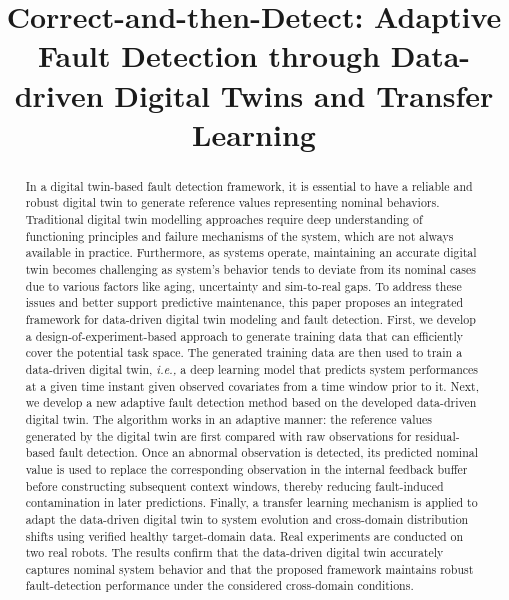 \documentclass[a4paper,10pt]{cas-sc}%
\newcommand{\roundtworev}[1]{\textcolor{roundtwored}{#1}}
\begin{document}
\let\WriteBookmarks\relax
\def\floatpagepagefraction{1}
\def\textpagefraction{.001}
\shorttitle{}
\let\printorcid\relax %



\title [mode = title]{Correct-and-then-Detect: Adaptive Fault Detection through Data-driven Digital Twins and Transfer Learning}




\begin{abstract}
	In a digital twin-based fault detection framework, it is essential to have a reliable and robust digital twin to generate reference values representing nominal behaviors. Traditional digital twin modelling approaches require deep understanding of functioning principles and failure mechanisms of the system, which are not always available in practice. Furthermore, as systems operate, maintaining an accurate digital twin becomes challenging as system's behavior tends to deviate from its nominal cases due to various factors like aging, uncertainty and sim-to-real gaps. To address these issues and better support predictive maintenance, this paper proposes an integrated framework for data-driven digital twin modeling and fault detection. First, we develop a design-of-experiment-based approach to generate training data that can efficiently cover the potential task space. The generated training data are then used to train a data-driven digital twin, \emph{i.e.,} a deep learning model that predicts system performances at a given time instant given observed covariates from a time window prior to it. Next, we develop a new adaptive fault detection method based on the developed data-driven digital twin. \roundtworev{The algorithm works in an adaptive manner: the reference values generated by the digital twin are first compared with raw observations for residual-based fault detection. Once an abnormal observation is detected, its predicted nominal value is used to replace the corresponding observation in the internal feedback buffer before constructing subsequent context windows, thereby reducing fault-induced contamination in later predictions.} \roundtworev{Finally, a transfer learning mechanism is applied to adapt the data-driven digital twin to system evolution and cross-domain distribution shifts using verified healthy target-domain data.} Real experiments are conducted on two real robots. \roundtworev{The results confirm that the data-driven digital twin accurately captures nominal system behavior and that the proposed framework maintains robust fault-detection performance under the considered cross-domain conditions.}
\end{abstract}
\end{document}
